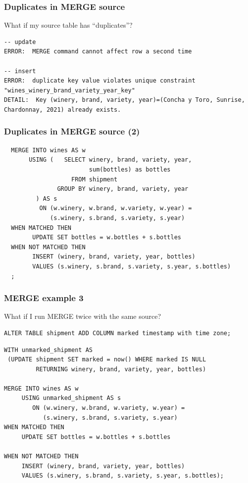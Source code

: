 \documentclass[ignorenonframetext,t]{beamer}
\begin{document}
\begin{frame}[fragile]
  \frametitle{Duplicates in MERGE source}

  What if my source table has ``duplicates''?

  \pause
  \begin{verbatim}
-- update
ERROR:  MERGE command cannot affect row a second time

-- insert
ERROR:  duplicate key value violates unique constraint "wines_winery_brand_variety_year_key"
DETAIL:  Key (winery, brand, variety, year)=(Concha y Toro, Sunrise, Chardonnay, 2021) already exists.
\end{verbatim}
\end{frame}

\begin{frame}[fragile]
  \frametitle{Duplicates in MERGE source (2)}
  \begin{lstlisting}
  MERGE INTO wines AS w
       USING (   SELECT winery, brand, variety, year,
                        sum(bottles) as bottles
                   FROM shipment
               GROUP BY winery, brand, variety, year
	     ) AS s
          ON (w.winery, w.brand, w.variety, w.year) =
             (s.winery, s.brand, s.variety, s.year)
  WHEN MATCHED THEN
        UPDATE SET bottles = w.bottles + s.bottles
  WHEN NOT MATCHED THEN
        INSERT (winery, brand, variety, year, bottles)
        VALUES (s.winery, s.brand, s.variety, s.year, s.bottles)
  ;
  \end{lstlisting}	
\end{frame}

\begin{frame}[fragile]
  \frametitle{MERGE example 3}

  What if I run MERGE twice with the same source?
  \pause
  \begin{lstlisting}
ALTER TABLE shipment ADD COLUMN marked timestamp with time zone;
  \end{lstlisting}
\pause
  \begin{lstlisting}
WITH unmarked_shipment AS
 (UPDATE shipment SET marked = now() WHERE marked IS NULL
         RETURNING winery, brand, variety, year, bottles)

MERGE INTO wines AS w
     USING unmarked_shipment AS s
        ON (w.winery, w.brand, w.variety, w.year) =
           (s.winery, s.brand, s.variety, s.year)
WHEN MATCHED THEN
     UPDATE SET bottles = w.bottles + s.bottles

WHEN NOT MATCHED THEN
     INSERT (winery, brand, variety, year, bottles)
     VALUES (s.winery, s.brand, s.variety, s.year, s.bottles);
  \end{lstlisting}
\end{frame}
\end{document}
